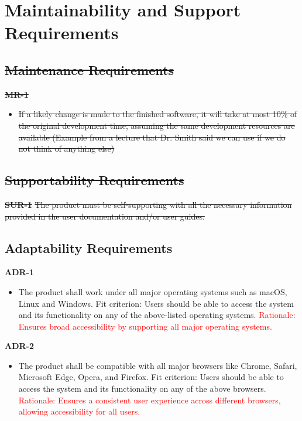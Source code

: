 \documentclass[12pt]{article}
\begin{document}
\section{Maintainability and Support Requirements}
\subsection{\sout{Maintenance Requirements}}
\textbf{\sout{MR-1}}
\begin{itemize}
    \item \sout{If a likely change is made to the finished software, it will take at most 10\% of the original development time, assuming the same development resources are available (Example from a lecture that Dr. Smith said we can use if we do not think of anything else)}
\end{itemize}
\subsection{\sout{Supportability Requirements}}
\textbf{\sout{SUR-1}}
\sout{The product must be self-supporting with all the necessary information provided in the user documentation and/or user guides.}

\subsection{Adaptability Requirements}
\textbf{ADR-1}
\begin{itemize}
    \item The product shall work under all major operating systems such as macOS, Linux and Windows. \hfill \break
    Fit criterion: Users should be able to access the system and its functionality on any of the above-listed operating systems.
    \hfill \break
    \textcolor{red} {Rationale: Ensures broad accessibility by supporting all major operating systems.}
\end{itemize}
\textbf{ADR-2}
\begin{itemize}
    \item The product shall be compatible with all major browsers like Chrome, Safari, Microsoft Edge, Opera, and Firefox. \hfill \break
    Fit criterion: Users should be able to access the system and its functionality on any of the above browsers.
    \hfill \break
    \textcolor{red} {Rationale: Ensures a consistent user experience across different browsers, allowing accessibility for all users.}
\end{itemize}
\end{document}
